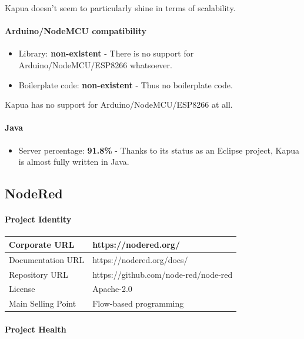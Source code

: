 \documentclass{article}
\begin{document}
Kapua doesn't seem to particularly shine in terms of scalability.

\paragraph{Arduino/NodeMCU compatibility}

\begin{itemize}
\item Library: \textbf{non-existent} - There is no support for Arduino/NodeMCU/ESP8266 whatsoever.
\item Boilerplate code: \textbf{non-existent} - Thus no boilerplate code.
\end{itemize}

Kapua has no support for Arduino/NodeMCU/ESP8266 at all.

\paragraph{Java}

\begin{itemize}
\item Server percentage: \textbf{91.8\%} - Thanks to its status as an Eclipse project, Kapua is almost fully written in Java.
\end{itemize}

\subsection{NodeRed}

\paragraph{Project Identity}

\begin{center}
\begin{tabular}{|l|l|}
\hline
Corporate URL & https://nodered.org/ \\ \hline
Documentation URL & https://nodered.org/docs/ \\ \hline
Repository URL & https://github.com/node-red/node-red \\ \hline
License & Apache-2.0 \\ \hline
Main Selling Point & Flow-based programming \\ \hline
\end{tabular}
\end{center}

\paragraph{Project Health}
\end{document}

